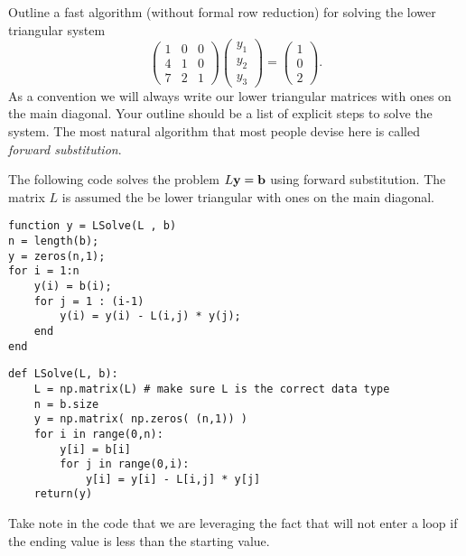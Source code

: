 \begin{problem}
    Outline a fast algorithm (without formal row reduction) for solving the lower triangular system
    \[ \begin{pmatrix} 1 & 0 & 0 \\ 4 & 1 & 0 \\ 7 & 2 & 1 \end{pmatrix} \begin{pmatrix}
        y_1 \\ y_2 \\ y_3 \end{pmatrix} = \begin{pmatrix} 1 \\ 0 \\ 2\end{pmatrix}. \]
    As a convention we will always write our lower triangular matrices with ones on the
    main diagonal.  Your outline should be a list of explicit steps to solve the system.
    The most natural algorithm that most people devise here is called {\it forward
    substitution}.
\end{problem}


\begin{technique}\label{tech:lsolve}
    The following code solves the problem $L {\bf y} = {\bf b}$ using forward
    substitution.  The matrix $L$ is assumed the be lower triangular with ones on the main
    diagonal.

\bcode
\ifnum{}
\begin{lstlisting}
function y = LSolve(L , b)
n = length(b);
y = zeros(n,1);
for i = 1:n
    y(i) = b(i);
    for j = 1 : (i-1)
        y(i) = y(i) - L(i,j) * y(j);
    end
end
\end{lstlisting}
\else
\begin{lstlisting}
def LSolve(L, b):
    L = np.matrix(L) # make sure L is the correct data type
    n = b.size
    y = np.matrix( np.zeros( (n,1)) )
    for i in range(0,n):
        y[i] = b[i]
        for j in range(0,i):
            y[i] = y[i] - L[i,j] * y[j]
    return(y)
\end{lstlisting}
\fi
Take note in the code that we are leveraging the fact that \ProgLang will not enter a
 loop if the ending value is less than the starting value.
\end{technique}

